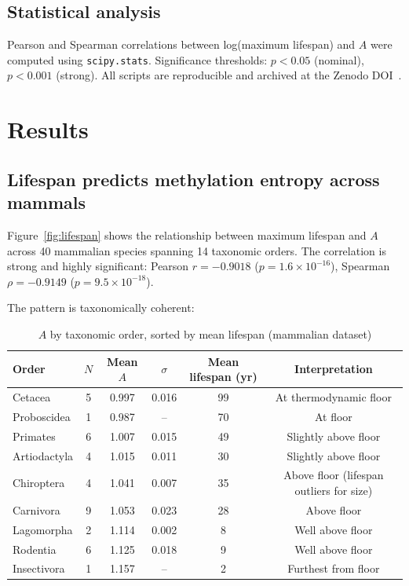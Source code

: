 \documentclass[11pt,a4paper]{article}
\newcommand{\Ascore}{A}
\begin{document}
\subsection{Statistical analysis}

Pearson and Spearman correlations between log(maximum lifespan) and $\Ascore$
were computed using \texttt{scipy.stats}. Significance thresholds: $p < 0.05$
(nominal), $p < 0.001$ (strong). All scripts are reproducible and archived at
the Zenodo DOI~\citep{Mahaffey2026}.

\section{Results}

\subsection{Lifespan predicts methylation entropy across mammals}

Figure~\ref{fig:lifespan} shows the relationship between
maximum lifespan and $\Ascore$ across 40 mammalian species spanning 14
taxonomic orders. The correlation is strong and highly significant:
Pearson $r = -0.9018$ ($p = 1.6 \times 10^{-16}$),
Spearman $\rho = -0.9149$ ($p = 9.5 \times 10^{-18}$).

The pattern is taxonomically coherent:

\begin{table}[ht]
\centering
\small
\caption{$\Ascore$ by taxonomic order, sorted by mean lifespan (mammalian dataset)}
\renewcommand{\arraystretch}{1.2}
\begin{tabular}{lccccc}
\toprule
Order & $N$ & Mean $\Ascore$ & $\sigma$ & Mean lifespan (yr) & Interpretation \\
\midrule
Cetacea      & 5 & 0.997 & 0.016 & 99 & At thermodynamic floor \\
Proboscidea  & 1 & 0.987 & --    & 70 & At floor \\
Primates     & 6 & 1.007 & 0.015 & 49 & Slightly above floor \\
Artiodactyla & 4 & 1.015 & 0.011 & 30 & Slightly above floor \\
Chiroptera   & 4 & 1.041 & 0.007 & 35 & Above floor (lifespan outliers for size) \\
Carnivora    & 9 & 1.053 & 0.023 & 28 & Above floor \\
Lagomorpha   & 2 & 1.114 & 0.002 & 8  & Well above floor \\
Rodentia     & 6 & 1.125 & 0.018 & 9  & Well above floor \\
Insectivora  & 1 & 1.157 & --    & 2  & Furthest from floor \\
\bottomrule
\end{tabular}
\end{table}
\end{document}
